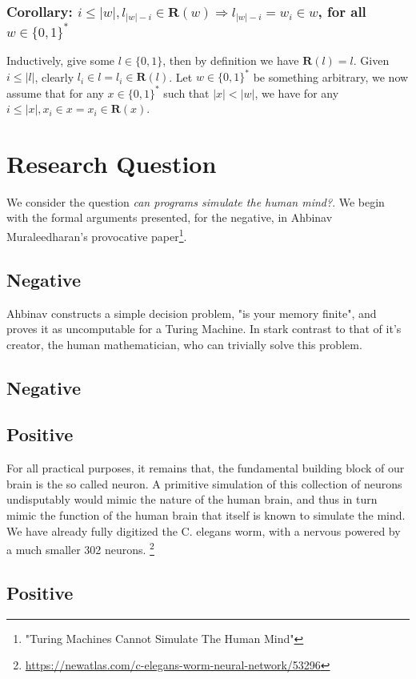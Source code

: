 \documentclass{article}
\begin{document}
\subsubsection*{Corollary: $i \leq |w|, l_{|w| - i} \in \bm{R}(w) \Rightarrow l_{|w| - i}=w_i \in w$, for all $w \in \{0,1\}^*$}
Inductively, give some $l \in \{0,1\}$, then by definition we have $\bm{R}(l) = l$. Given $i \leq |l|$, clearly $l_i \in l = l_i \in \bm{R}(l)$. Let $w \in \{0,1\}^*$ be something arbitrary, we now assume that for any $x \in \{0,1\}^*$ such that $|x| < |w|$, we have for any $i \leq |x|, x_i \in x = x_i \in \bm{R}(x)$.

\section*{Research Question}
We consider the question \emph{can programs simulate the human mind?}. We begin with the formal arguments presented, for the negative, in Ahbinav Muraleedharan's provocative paper\footnote{"Turing Machines Cannot Simulate The Human Mind"}.

\subsection*{Negative}
Ahbinav constructs a simple decision problem, "is your memory finite", and proves it as uncomputable for a Turing Machine. In stark contrast to that of it's creator, the human mathematician, who can trivially solve this problem.

\subsection*{Negative}

\subsection*{Positive}
For all practical purposes, it remains that, the fundamental building block of our brain is the so called neuron. A primitive simulation of this collection of neurons undisputably would mimic the nature of the human brain, and thus in turn mimic the function of the human brain that itself is known to simulate the mind. We have already fully digitized the C. elegans worm, with a nervous powered by a much smaller 302 neurons. \footnote{\url{https://newatlas.com/c-elegans-worm-neural-network/53296}}

\subsection*{Positive}
\end{document}
